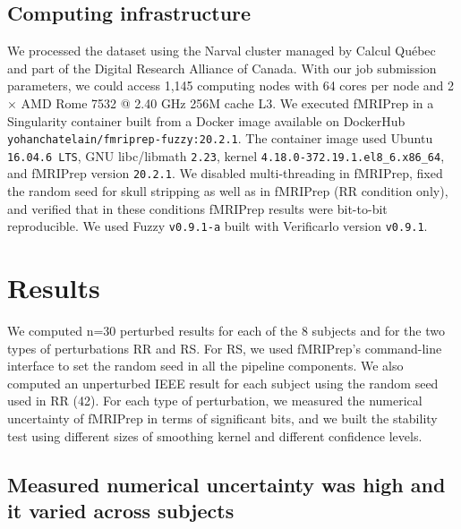 \documentclass[lettersize,journal]{IEEEtran}
\newcommand{\fmriprep}{fMRIPrep\xspace}
\begin{document}
\subsection{Computing infrastructure}

We processed the dataset using the Narval cluster managed by Calcul Qu\'ebec and part of the Digital Research Alliance of Canada. With our job submission parameters, we could access 1,145 computing nodes with 64 cores per node and 2 $\times$ AMD Rome 7532 @ 2.40 GHz 256M cache L3. We executed \fmriprep in a Singularity container built from a Docker image available on DockerHub \texttt{yohanchatelain/fmriprep-fuzzy:20.2.1}. The container image used Ubuntu \texttt{16.04.6 LTS}, GNU libc/libmath \texttt{2.23}, kernel \texttt{4.18.0-372.19.1}\texttt{.el8\_6.x86\_64}, and fMRIPrep version \texttt{20.2.1}. We disabled multi-threading in fMRIPrep, fixed the random seed for skull stripping as well as in fMRIPrep (RR condition only), and verified that in these conditions fMRIPrep results were bit-to-bit reproducible.
We used Fuzzy \texttt{v0.9.1-a} built with Verificarlo version \texttt{v0.9.1}.

\section{Results}

We computed n=30 perturbed results for each of the 8 subjects and for the two types of perturbations RR and RS. For RS, we used \fmriprep's command-line interface to set the random seed in all the pipeline components. We also computed an unperturbed IEEE result for each subject using the
random seed used in RR (42). For each type of perturbation, we measured the numerical uncertainty of fMRIPrep in terms of significant bits, and we built the stability test using different sizes of  smoothing kernel and different confidence levels.

\subsection{Measured numerical uncertainty was high and it varied across subjects}
\end{document}
